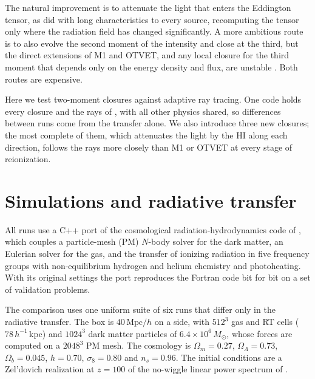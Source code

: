 \documentclass[11pt]{article}
\newcommand{\mpch}{\,\mathrm{Mpc}/h}
\begin{document}
The natural improvement is to attenuate the light that enters the
Eddington tensor, as \citet{finlator09} did with long characteristics to
every source, recomputing the tensor only where the radiation field has
changed significantly. A more ambitious route is to also evolve the
second moment of the intensity and close at the third, but the direct
extensions of M1 and OTVET, and any local closure for the third moment
that depends only on the energy density and flux, are unstable
\citep{gnedinkatz26}. Both routes are expensive.

Here we test two-moment closures against adaptive ray tracing. One code
holds every closure and the rays of \citet{trac07}, with all other
physics shared, so differences between runs come from the transfer alone.
We also introduce three new closures; the most complete of them, which
attenuates the light by the HI along each direction, follows the rays
more closely than M1 or OTVET at every stage of reionization.
\section{Simulations and radiative transfer}\label{sec:methods}


All runs use a C++ port of the cosmological radiation-hydrodynamics code
of \citet{trac07}, which couples a
particle-mesh (PM) $N$-body solver for the dark matter, an Eulerian solver
for the gas, and the transfer of ionizing radiation in five frequency
groups with non-equilibrium hydrogen and helium chemistry and
photoheating. With its original settings the port reproduces the Fortran
code bit for bit on a set of validation problems. %

The comparison uses one uniform suite of six runs that differ only in
the radiative transfer. The box is $40\mpch$ on a
side, with $512^3$ gas and RT cells ($78\,h^{-1}$\,kpc) and $1024^3$ dark
matter particles of $6.4\times10^6\,M_\odot$, whose forces are computed on
a $2048^3$ PM mesh. The cosmology is $\Omega_m=0.27$,
$\Omega_\Lambda=0.73$, $\Omega_b=0.045$, $h=0.70$, $\sigma_8=0.80$ and
$n_s=0.96$. The initial conditions are a Zel'dovich realization at $z=100$
of the no-wiggle linear power spectrum of \citet{eisenstein98}.
\end{document}
